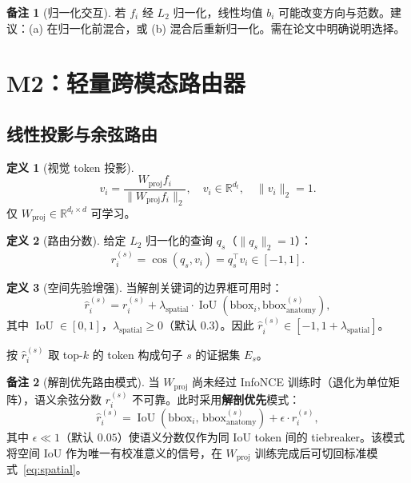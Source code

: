 \documentclass[11pt,a4paper]{article}
\newcommand{\RR}{\mathbb{R}}
\newcommand{\IoU}{\operatorname{IoU}}
\newcommand{\cosine}{\operatorname{cos}}
\theoremstyle{definition}
\newtheorem{definition}{定义}[section]
\newtheorem{remark}{备注}[section]
\begin{document}
\begin{remark}[归一化交互]
若 $f_i$ 经 $L_2$ 归一化，线性均值 $b_i$ 可能改变方向与范数。建议：(a) 在归一化前混合，或 (b) 混合后重新归一化。需在论文中明确说明选择。
\end{remark}


\section{M2：轻量跨模态路由器}

\subsection{线性投影与余弦路由}

\begin{definition}[视觉 token 投影]
\begin{equation}\label{eq:proj}
v_i = \frac{W_{\mathrm{proj}} f_i}{\|W_{\mathrm{proj}} f_i\|_2}, \quad v_i \in \RR^{d_t}, \quad \|v_i\|_2 = 1.
\end{equation}
仅 $W_{\mathrm{proj}} \in \RR^{d_t \times d}$ 可学习。
\end{definition}

\begin{definition}[路由分数]
给定 $L_2$ 归一化的查询 $q_s$（$\|q_s\|_2=1$）：
\begin{equation}\label{eq:route}
r_i^{(s)} = \cosine(q_s, v_i) = q_s^\top v_i \in [-1, 1].
\end{equation}
\end{definition}

\begin{definition}[空间先验增强]
当解剖关键词的边界框可用时：
\begin{equation}\label{eq:spatial}
\hat{r}_i^{(s)} = r_i^{(s)} + \lambda_{\mathrm{spatial}} \cdot \IoU(\mathrm{bbox}_i, \mathrm{bbox}_{\mathrm{anatomy}}^{(s)}),
\end{equation}
其中 $\IoU \in [0,1]$，$\lambda_{\mathrm{spatial}} \geq 0$（默认 0.3）。因此 $\hat{r}_i^{(s)} \in [-1, 1+\lambda_{\mathrm{spatial}}]$。
\end{definition}

按 $\hat{r}_i^{(s)}$ 取 top-$k$ 的 token 构成句子 $s$ 的证据集 $E_s$。

\begin{remark}[解剖优先路由模式]\label{rmk:anat_primary}
当 $W_{\mathrm{proj}}$ 尚未经过 InfoNCE 训练时（退化为单位矩阵），语义余弦分数 $r_i^{(s)}$ 不可靠。此时采用\textbf{解剖优先}模式：
\begin{equation}\label{eq:anat_primary}
\hat{r}_i^{(s)} = \IoU(\mathrm{bbox}_i,\, \mathrm{bbox}_{\mathrm{anatomy}}^{(s)}) + \epsilon \cdot r_i^{(s)},
\end{equation}
其中 $\epsilon \ll 1$（默认 $0.05$）使语义分数仅作为同 IoU token 间的 tiebreaker。该模式将空间 IoU 作为唯一有校准意义的信号，在 $W_{\mathrm{proj}}$ 训练完成后可切回标准模式~\eqref{eq:spatial}。
\end{remark}
\end{document}
